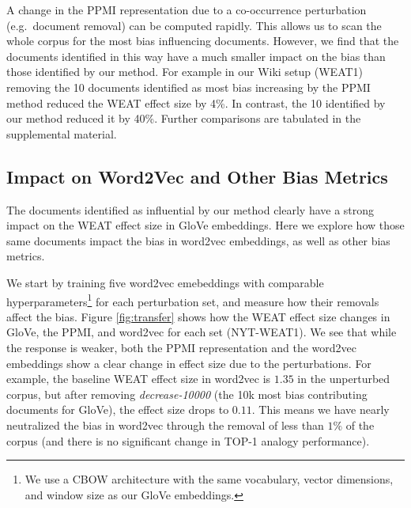 \documentclass{article}
\begin{document}
A change in the PPMI representation due to a co-occurrence perturbation (e.g.\ document removal) can be computed rapidly.
This allows us to scan the whole corpus for the most bias influencing documents.
However, we find that the documents identified in this way have a much smaller impact on the bias than those identified by our method. 
For example in our Wiki setup (WEAT1) removing the 10 documents identified as most bias increasing by the PPMI method reduced the WEAT effect size by 4\%.
In contrast, the 10 identified by our method reduced it by 40\%.
Further comparisons are tabulated in the supplemental material. 



\subsection{Impact on Word2Vec and Other Bias Metrics}
The documents identified as influential by our method clearly have a strong impact on the WEAT effect size in GloVe embeddings. Here we explore how those same documents impact the bias in word2vec embeddings, as well as other bias metrics. 

We start by training five word2vec emebeddings with comparable hyperparameters\footnote{We use a CBOW architecture with the same vocabulary, vector dimensions, and window size as our GloVe embeddings.} for each perturbation set, and measure how their removals affect the bias. 
Figure \ref{fig:transfer} shows how the WEAT effect size changes in GloVe, the PPMI, and word2vec for each set (NYT-WEAT1). 
We see that while the response is weaker, both the PPMI representation and the word2vec embeddings show a clear change in effect size due to the perturbations.
For example, the baseline WEAT effect size in word2vec is $1.35$ in the unperturbed corpus, but after removing \textit{decrease-10000} (the 10k most bias contributing documents for GloVe), the effect size drops to $0.11$.
This means we have nearly neutralized the bias in word2vec through the removal of less than $1\%$ of the corpus (and there is no significant change in TOP-1 analogy performance). 
\end{document}
